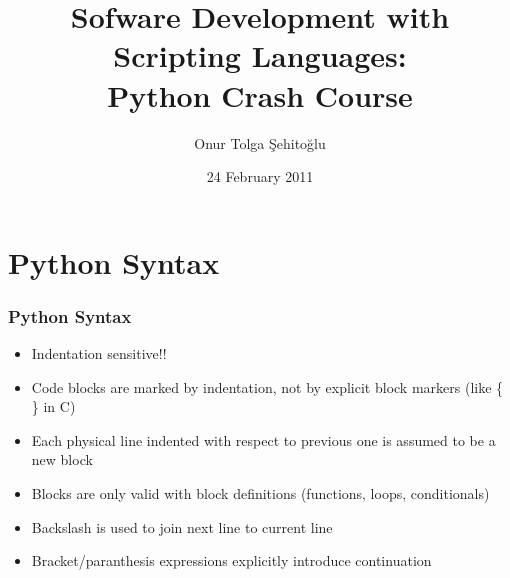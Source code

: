 \documentclass[trans,compress,xcolor=table]{beamer}
\title{Sofware Development with Scripting Languages:\\Python Crash Course}
\author{Onur Tolga Şehitoğlu}
\institute{Computer Engineering,METU}
\date{24 February 2011}
\begin{document}

%


 \frame{\maketitle}
\begin{frame}
\begin{multicols}{2}
\tableofcontents
\end{multicols}
\end{frame}

\section{Python Syntax}
\begin{frame}
\frametitle{Python Syntax}
\begin{itemize}
\item \alert{Indentation sensitive!!}
\item Code blocks are marked by indentation, not by explicit block markers (like \{ \} in C)
\item Each physical line indented with respect to previous one is assumed to be a new block
\item Blocks are only valid with block definitions (functions, loops, conditionals)
\item Backslash is used to join next line to current line 
\item Bracket/paranthesis expressions explicitly introduce continuation
\end{itemize}
\end{frame}
\end{document}

